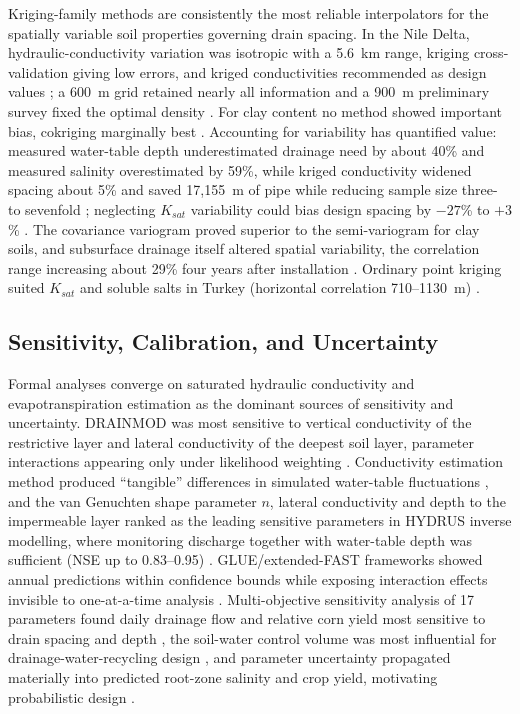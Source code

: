 Kriging-family methods are consistently the most reliable interpolators for the spatially variable soil properties governing drain spacing. In the Nile Delta, hydraulic-conductivity variation was isotropic with a 5.6~km range, kriging cross-validation giving low errors, and kriged conductivities recommended as design values \parencite{GALLICHAND1991}; a 600~m grid retained nearly all information and a 900~m preliminary survey fixed the optimal density \parencite{GALLICHAND1992}. For clay content no method showed important bias, cokriging marginally best \parencite{GALLICHAND1993}. Accounting for variability has quantified value: measured water-table depth underestimated drainage need by about 40\% and measured salinity overestimated by 59\%, while kriged conductivity widened spacing about 5\% and saved 17{,}155~m of pipe while reducing sample size three- to sevenfold \parencite{Moustafa1998b}; neglecting $K_{sat}$ variability could bias design spacing by $-27$\% to $+3$\% \parencite{Moustafa2000}. The covariance variogram proved superior to the semi-variogram for clay soils, and subsurface drainage itself altered spatial variability, the correlation range increasing about 29\% four years after installation \parencite{Moustafa1998}. Ordinary point kriging suited $K_{sat}$ and soluble salts in Turkey (horizontal correlation 710--1130~m) \parencite{Akis2015,Sepaskhah2004}.

\subsection{Sensitivity, Calibration, and Uncertainty}

Formal analyses converge on saturated hydraulic conductivity and evapotranspiration estimation as the dominant sources of sensitivity and uncertainty. \textsc{DRAINMOD} was most sensitive to vertical conductivity of the restrictive layer and lateral conductivity of the deepest soil layer, parameter interactions appearing only under likelihood weighting \parencite{Wang2006}. Conductivity estimation method produced ``tangible'' differences in simulated water-table fluctuations \parencite{NabiSichani2012}, and the van Genuchten shape parameter $n$, lateral conductivity and depth to the impermeable layer ranked as the leading sensitive parameters in HYDRUS inverse modelling, where monitoring discharge together with water-table depth was sufficient (NSE up to 0.83--0.95) \parencite{Sedaghatdoost2018}. GLUE/extended-FAST frameworks showed annual predictions within confidence bounds while exposing interaction effects invisible to one-at-a-time analysis \parencite{Wang2006}. Multi-objective sensitivity analysis of 17 parameters found daily drainage flow and relative corn yield most sensitive to drain spacing and depth \parencite{Timalsina2023}, the soil-water control volume was most influential for drainage-water-recycling design \parencite{Reinhart2020}, and parameter uncertainty propagated materially into predicted root-zone salinity and crop yield, motivating probabilistic design \parencite{Alzraiee2013,Alzraiee2013b}.

